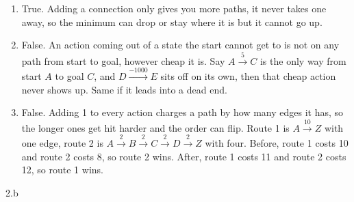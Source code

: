 \begin{answer}
  \begin{enumerate}
    \item True. Adding a connection only gives you more paths, it never takes one away, so the
    minimum can drop or stay where it is but it cannot go up.

    \item False. An action coming out of a state the start cannot get to is not on any path from
    start to goal, however cheap it is. Say $A \xrightarrow{5} C$ is the only way from start $A$ to
    goal $C$, and $D \xrightarrow{-1000} E$ sits off on its own, then that cheap action never shows
    up. Same if it leads into a dead end.

    \item False. Adding 1 to every action charges a path by how many edges it has, so the longer
    ones get hit harder and the order can flip. Route 1 is $A \xrightarrow{10} Z$ with one edge,
    route 2 is $A \xrightarrow{2} B \xrightarrow{2} C \xrightarrow{2} D \xrightarrow{2} Z$ with
    four. Before, route 1 costs 10 and route 2 costs 8, so route 2 wins. After, route 1 costs 11 and
    route 2 costs 12, so route 1 wins.
  \end{enumerate}
\end{answer}
\clearpage

\LARGE
2.b
\normalsize

